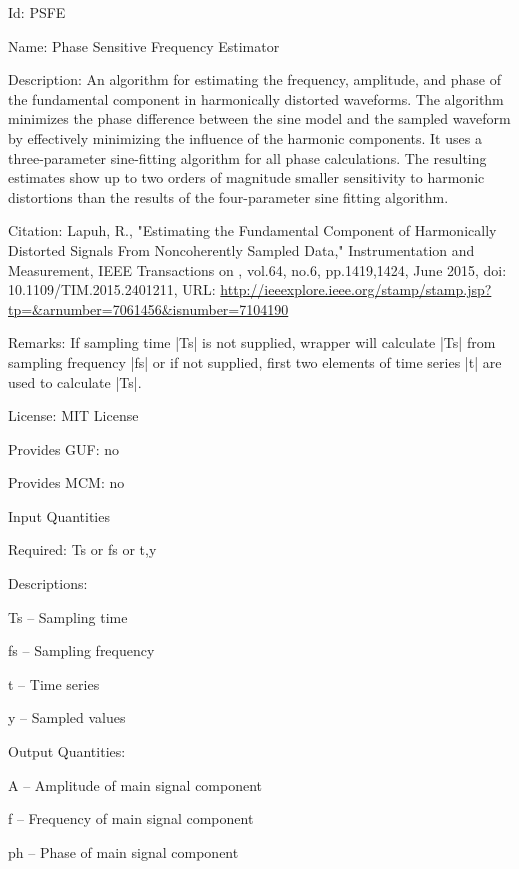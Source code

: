 \begin{tightdesc}
\item [Id:] PSFE
\item [Name:] Phase Sensitive Frequency Estimator
\item [Description:] An algorithm for estimating the frequency, amplitude, and phase of the fundamental component in harmonically distorted waveforms. The algorithm minimizes the phase difference between the sine model and the sampled waveform by effectively minimizing the influence of the harmonic components. It uses a three-parameter sine-fitting algorithm for all phase calculations. The resulting estimates show up to two orders of magnitude smaller sensitivity to harmonic distortions than the results of the four-parameter sine fitting algorithm.
\item [Citation:] Lapuh, R., "Estimating the Fundamental Component of Harmonically Distorted Signals From Noncoherently Sampled Data," Instrumentation and Measurement, IEEE Transactions on , vol.64, no.6, pp.1419,1424, June 2015, doi: 10.1109/TIM.2015.2401211, URL: \url{http://ieeexplore.ieee.org/stamp/stamp.jsp?tp=\&arnumber=7061456\&isnumber=7104190}
\item [Remarks:] If sampling time |Ts| is not supplied, wrapper will calculate |Ts| from sampling frequency |fs| or if not supplied, first two elements of time series |t| are used to calculate |Ts|.
\item [License:] MIT License
\item [Provides GUF:] no
\item [Provides MCM:] no
\item [Input Quantities] \rule{0em}{0em}
    \begin{tightdesc}
    \item [Required:] 
        \textsf{Ts} or \textsf{fs} or \textsf{t},\enspace \textsf{y}
    \item [Descriptions:] \rule{0em}{0em}
        \begin{tightdesc}
            \item[\textsf{Ts}] -- Sampling time
            \item[\textsf{fs}] -- Sampling frequency
            \item[\textsf{t}] -- Time series
            \item[\textsf{y}] -- Sampled values
        \end{tightdesc}
    \end{tightdesc}
\item [Output Quantities:] \rule{0em}{0em}
    \begin{tightdesc}
        \item[\textsf{A}] -- Amplitude of main signal component
        \item[\textsf{f}] -- Frequency of main signal component
        \item[\textsf{ph}] -- Phase of main signal component
    \end{tightdesc}
\end{tightdesc}
